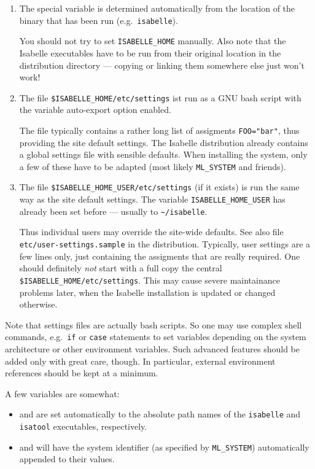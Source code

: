 \begin{enumerate}
\item The special variable  is determined
  automatically from the location of the binary that has been run
  (e.g.\ \texttt{isabelle}).
  
  You should not try to set \texttt{ISABELLE_HOME} manually. Also note
  that the Isabelle executables have to be run from their original
  location in the distribution directory --- copying or linking them
  somewhere else just won't work!
  
\item The file \texttt{\$ISABELLE_HOME/etc/settings} ist run as a GNU
  bash script with the variable auto-export option enabled.
  
  The file typically contains a rather long list of assigments
  \texttt{FOO="bar"}, thus providing the site default settings. The
  Isabelle distribution already contains a global settings file with
  sensible defaults. When installing the system, only a few of these
  have to be adapted (most likely \texttt{ML_SYSTEM} and friends).
  
\item The file \texttt{\$ISABELLE_HOME_USER/etc/settings} (if it
  exists) is run the same way as the site default settings. The
  variable \texttt{ISABELLE_HOME_USER} has already been set before ---
  usually to \texttt{\~\relax/isabelle}.
  
  Thus individual users may override the site-wide defaults. See also
  file \texttt{etc/user-settings.sample} in the distribution.
  Typically, user settings are a few lines only, just containing the
  assigments that are really required.  One should definitely
  \emph{not} start with a full copy the central
  \texttt{\$ISABELLE_HOME/etc/settings}. This may cause severe
  maintainance problems later, when the Isabelle installation is
  updated or changed otherwise.

\end{enumerate}

Note that settings files are actually bash scripts. So one may use
complex shell commands, e.g.\ \texttt{if} or \texttt{case} statements
to set variables depending on the system architecture or other
environment variables. Such advanced features should be added only
with great care, though. In particular, external environment
references should be kept at a minimum.

\medskip A few variables are somewhat:
\begin{itemize}
\item {} and  are set automatically
  to the absolute path names of the \texttt{isabelle} and
  \texttt{isatool} executables, respectively.
  
\item {} and  will have
  the {\ML} system identifier (as specified by \texttt{ML_SYSTEM})
  automatically appended to their values.
\end{itemize}

